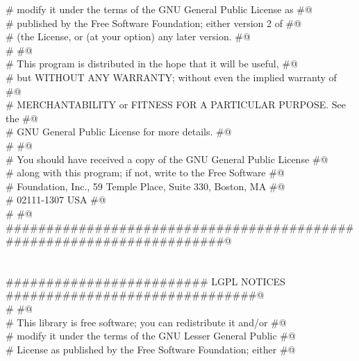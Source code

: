 \documentclass[10pt,a4paper,twoside,notitlepage]{article}
\begin{document}
\begin{flushleft}
\begin{minipage}{\linewidth}
\begin{list}{}{}
\mbox{}\verb@# modify it under the terms of the GNU General Public License as     #@\\
\mbox{}\verb@# published by the Free Software Foundation; either version 2 of     #@\\
\mbox{}\verb@# (the License, or (at your option) any later version.               #@\\
\mbox{}\verb@#                                                                    #@\\
\mbox{}\verb@# This program is distributed in the hope that it will be useful,    #@\\
\mbox{}\verb@# but WITHOUT ANY WARRANTY; without even the implied warranty of     #@\\
\mbox{}\verb@# MERCHANTABILITY or FITNESS FOR A PARTICULAR PURPOSE.  See the      #@\\
\mbox{}\verb@# GNU General Public License for more details.                       #@\\
\mbox{}\verb@#                                                                    #@\\
\mbox{}\verb@# You should have received a copy of the GNU General Public License  #@\\
\mbox{}\verb@# along with this program; if not, write to the Free Software        #@\\
\mbox{}\verb@# Foundation, Inc., 59 Temple Place, Suite 330, Boston, MA           #@\\
\mbox{}\verb@# 02111-1307  USA                                                    #@\\
\mbox{}\verb@#                                                                    #@\\
\mbox{}\verb@######################################################################@\\
\mbox{}\verb@@\\
\mbox{}\verb@@\\
\mbox{}\verb@######################### LGPL NOTICES ###############################@\\
\mbox{}\verb@#                                                                    #@\\
\mbox{}\verb@# This library is free software; you can redistribute it and/or      #@\\
\mbox{}\verb@# modify it under the terms of the GNU Lesser General Public         #@\\
\mbox{}\verb@# License as published by the Free Software Foundation; either       #@\\

\end{list}
\end{minipage}
\end{flushleft}
\end{document}
